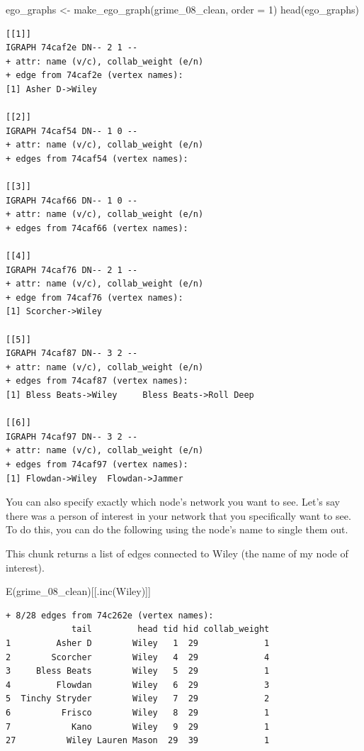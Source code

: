 \documentclass[
  letterpaper,
  DIV=11,
  numbers=noendperiod]{scrreprt}
\newenvironment{Shaded}{\begin{snugshade}}{\end{snugshade}}
\newcommand{\AttributeTok}[1]{\textcolor[rgb]{0.40,0.45,0.13}{#1}}
\newcommand{\DecValTok}[1]{\textcolor[rgb]{0.68,0.00,0.00}{#1}}
\newcommand{\FunctionTok}[1]{\textcolor[rgb]{0.28,0.35,0.67}{#1}}
\newcommand{\NormalTok}[1]{\textcolor[rgb]{0.00,0.23,0.31}{#1}}
\newcommand{\OtherTok}[1]{\textcolor[rgb]{0.00,0.23,0.31}{#1}}
\newcommand{\StringTok}[1]{\textcolor[rgb]{0.13,0.47,0.30}{#1}}
\begin{document}
\begin{Shaded}
\begin{Highlighting}[]
\NormalTok{ego\_graphs }\OtherTok{\textless{}{-}} \FunctionTok{make\_ego\_graph}\NormalTok{(grime\_08\_clean, }\AttributeTok{order =} \DecValTok{1}\NormalTok{)}
\FunctionTok{head}\NormalTok{(ego\_graphs)}
\end{Highlighting}
\end{Shaded}

\begin{verbatim}
[[1]]
IGRAPH 74caf2e DN-- 2 1 -- 
+ attr: name (v/c), collab_weight (e/n)
+ edge from 74caf2e (vertex names):
[1] Asher D->Wiley

[[2]]
IGRAPH 74caf54 DN-- 1 0 -- 
+ attr: name (v/c), collab_weight (e/n)
+ edges from 74caf54 (vertex names):

[[3]]
IGRAPH 74caf66 DN-- 1 0 -- 
+ attr: name (v/c), collab_weight (e/n)
+ edges from 74caf66 (vertex names):

[[4]]
IGRAPH 74caf76 DN-- 2 1 -- 
+ attr: name (v/c), collab_weight (e/n)
+ edge from 74caf76 (vertex names):
[1] Scorcher->Wiley

[[5]]
IGRAPH 74caf87 DN-- 3 2 -- 
+ attr: name (v/c), collab_weight (e/n)
+ edges from 74caf87 (vertex names):
[1] Bless Beats->Wiley     Bless Beats->Roll Deep

[[6]]
IGRAPH 74caf97 DN-- 3 2 -- 
+ attr: name (v/c), collab_weight (e/n)
+ edges from 74caf97 (vertex names):
[1] Flowdan->Wiley  Flowdan->Jammer
\end{verbatim}

You can also specify exactly which node's network you want to see. Let's
say there was a person of interest in your network that you specifically
want to see. To do this, you can do the following using the node's name
to single them out.

This chunk returns a list of edges connected to Wiley (the name of my
node of interest).

\begin{Shaded}
\begin{Highlighting}[]
\FunctionTok{E}\NormalTok{(grime\_08\_clean)[[}\FunctionTok{.inc}\NormalTok{(}\StringTok{\textquotesingle{}Wiley\textquotesingle{}}\NormalTok{)]]}
\end{Highlighting}
\end{Shaded}

\begin{verbatim}
+ 8/28 edges from 74c262e (vertex names):
             tail         head tid hid collab_weight
1         Asher D        Wiley   1  29             1
2        Scorcher        Wiley   4  29             4
3     Bless Beats        Wiley   5  29             1
4         Flowdan        Wiley   6  29             3
5  Tinchy Stryder        Wiley   7  29             2
6          Frisco        Wiley   8  29             1
7            Kano        Wiley   9  29             1
27          Wiley Lauren Mason  29  39             1
\end{verbatim}
\end{document}
